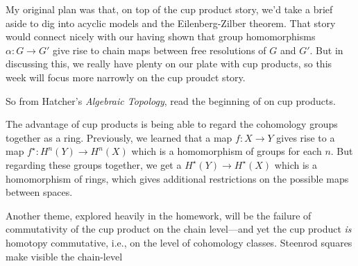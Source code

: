 \documentclass{homework}
\author{Jim Fowler}
\date{Week 6: Products}
\begin{document}
\maketitle

My original plan was that, on top of the cup product story, we'd take
a brief aside to dig into acyclic models and the Eilenberg-Zilber
theorem.  That story would connect nicely with our having shown that
group homomorphisms $\alpha : G \to G'$ give rise to chain maps
between free resolutions of $G$ and $G'$.  But in discussing this, we
really have plenty on our plate with cup products, so this week will
focus more narrowly on the cup proudct story.

So from Hatcher's \textit{Algebraic Topology}, read the beginning of
 on cup products.

The advantage of cup products is being able to regard the cohomology
groups together as a ring.  Previously, we learned that a map $f : X
\to Y$ gives rise to a map $f^\star : H^n(Y) \to H^n(X)$ which is a
homomorphism of groups for each $n$.  But regarding these groups
together, we get a $H^\star(Y) \to H^\star(X)$ which is a homomorphism
of rings, which gives additional restrictions on the possible maps
between spaces.

Another theme, explored heavily in the homework, will be the failure
of commutativity of the cup product on the chain level---and yet the
cup product \textit{is} homotopy commutative, i.e., on the level of
cohomology classes.  Steenrod squares make visible the chain-level
\end{document}
